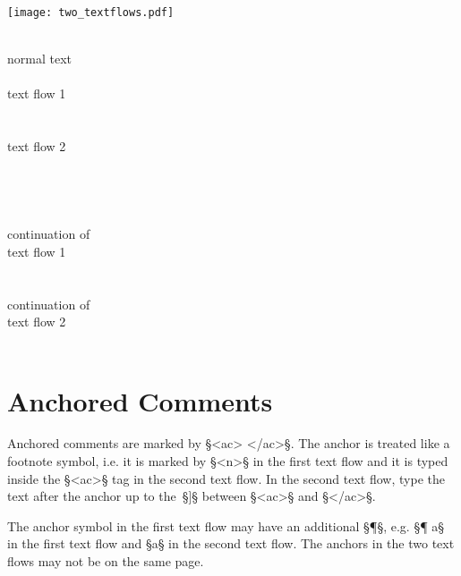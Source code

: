 \documentclass[fontsize=11pt, paper=a4, 
DIV15,
normalheadings,
parskip=half-, 
pointlessnumbers]{scrartcl}
\begin{document}
\begin{example}

\texttt{[image: two\_textflows.pdf]}

\begin{typeLatin}
 \\
normal text \\
 \\
text flow 1 \\
 \\
 \\
text flow 2 \\
 \\ \\
 \\
 \\
continuation of \\ 
text flow 1 \\
 \\
 \\
continuation of \\ 
text flow 2 \\
 \\
\end{typeLatin}
\end{example}

\section{Anchored Comments}

\begin{mainrule}
Anchored comments are marked by §<ac> </ac>§. The anchor is treated like a footnote symbol, i.e. it is marked by §<n>§ in the first text flow and it is typed inside the §<ac>§ tag in the second text flow. In the second text flow, type the text after the anchor up to the~§]§ between §<ac>§ and §</ac>§.
\end{mainrule}

\begin{clarification}
The anchor symbol in the first text flow may have an additional §¶§, e.g. §¶ a§ in the first text flow and §a§ in the second text flow. The anchors in the two text flows may not be on the same page.
\end{clarification}
\end{document}
